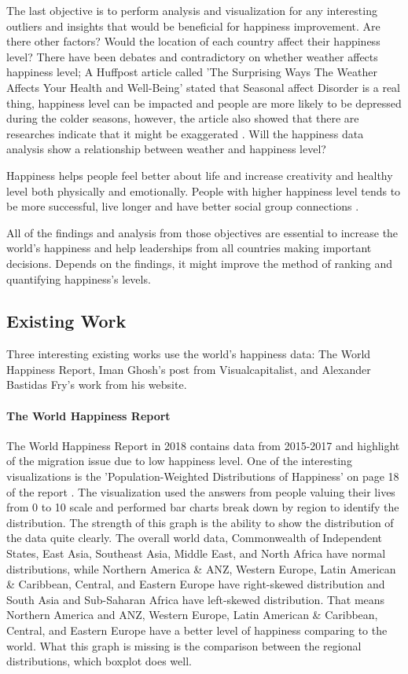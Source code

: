 \documentclass[11pt,twocolumn]{article}
\begin{document}
The last objective is to perform analysis and visualization for any interesting outliers and insights that would be beneficial for happiness improvement. Are there other factors? Would the location of each country affect their happiness level? There have been debates and contradictory on whether weather affects happiness level; A Huffpost article called 'The Surprising Ways The Weather Affects Your Health and Well-Being' stated that Seasonal affect Disorder is a real thing, happiness level can be impacted and people are more likely to be depressed during the colder seasons, however, the article also showed that there are researches indicate that it might be exaggerated \cite{huffpost}. Will the happiness data analysis show a relationship between weather and happiness level?  

Happiness helps people feel better about life and increase creativity and healthy level both physically and emotionally. People with higher happiness level tends to be more successful, live longer and have better social group connections \cite{happiness}. 

All of the findings and analysis from those objectives are essential to increase the world's happiness and help leaderships from all countries making important decisions. Depends on the findings, it might improve the method of ranking and quantifying happiness's levels.


\subsection{Existing Work}
Three interesting existing works use the world's happiness data: The World Happiness Report, Iman Ghosh's post from Visualcapitalist, and Alexander Bastidas Fry's work from his website.

\paragraph{The World Happiness Report \cite{world-happiness-report-2018}} The World Happiness Report in 2018 contains data from 2015-2017 and highlight of the migration issue due to low happiness level. One of the interesting visualizations is the 'Population-Weighted Distributions of Happiness' on page 18 of the report \cite{world-happiness-report-2018}. The visualization used the answers from people valuing their lives from 0 to 10 scale and performed bar charts break down by region to identify the distribution. The strength of this graph is the ability to show the distribution of the data quite clearly. The overall world data, Commonwealth of Independent States, East Asia, Southeast Asia, Middle East, and North Africa have normal distributions, while Northern America \& ANZ, Western Europe, Latin American \& Caribbean, Central, and Eastern Europe have right-skewed distribution and South Asia and Sub-Saharan Africa have left-skewed distribution. That means Northern America and ANZ, Western Europe, Latin American \& Caribbean, Central, and Eastern Europe have a better level of happiness comparing to the world. What this graph is missing is the comparison between the regional distributions, which boxplot does well.
\end{document}
